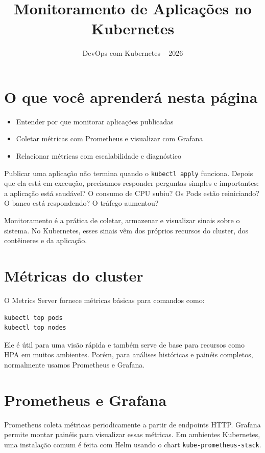 \documentclass[11pt,a4paper]{article}
\title{\color{secondary}\Huge\textbf{Monitoramento de Aplicações no Kubernetes}}
\author{\color{primary}DevOps com Kubernetes -- 2026}
\date{}
\begin{document}
\maketitle


\section*{\color{primary}O que você aprenderá nesta página}
\begin{itemize}
\item Entender por que monitorar aplicações publicadas
\item Coletar métricas com Prometheus e visualizar com Grafana
\item Relacionar métricas com escalabilidade e diagnóstico
\end{itemize}

Publicar uma aplicação não termina quando o \texttt{kubectl apply} funciona. Depois que ela está em execução, precisamos responder perguntas simples e importantes: a aplicação está saudável? O consumo de CPU subiu? Os Pods estão reiniciando? O banco está respondendo? O tráfego aumentou?

Monitoramento é a prática de coletar, armazenar e visualizar sinais sobre o sistema. No Kubernetes, esses sinais vêm dos próprios recursos do cluster, dos contêineres e da aplicação.

\section*{\color{primary}Métricas do cluster}

O Metrics Server fornece métricas básicas para comandos como:

\begin{lstlisting}[language=bash]
kubectl top pods
kubectl top nodes
\end{lstlisting}

Ele é útil para uma visão rápida e também serve de base para recursos como HPA em muitos ambientes. Porém, para análises históricas e painéis completos, normalmente usamos Prometheus e Grafana.

\section*{\color{primary}Prometheus e Grafana}

Prometheus coleta métricas periodicamente a partir de endpoints HTTP. Grafana permite montar painéis para visualizar essas métricas. Em ambientes Kubernetes, uma instalação comum é feita com Helm usando o chart \texttt{kube-prometheus-stack}.
\end{document}
